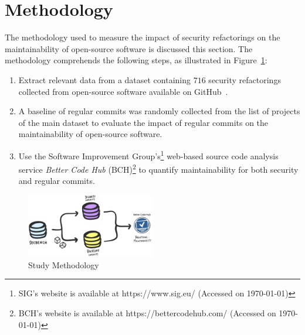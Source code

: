 \documentclass[10pt,conference]{IEEEtran}
\begin{document}
\section{Methodology}\label{sec:methodology}
%
The methodology used to measure the impact of security refactorings on the
maintainability of open-source software is discussed this section. The methodology
comprehends the following steps, as illustrated in Figure~\ref{fig:met}:
\begin{enumerate}
	\item Extract relevant data from a dataset containing
$716$ security refactorings collected from open-source software available on
GitHub~\cite{Reis:2017:IJSSE}.
	\item A baseline of regular commits was
randomly collected from the list of projects of the main dataset to evaluate the impact of regular commits on the maintainability of open-source
software.
\item Use the Software Improvement Group's\footnote{SIG's website is available
at https://www.sig.eu/ (Accessed on \today{})} web-based source code analysis
service \emph{Better Code Hub} (BCH)\footnote{BCH's website is available at
https://bettercodehub.com/ (Accessed on \today{})} to quantify
maintainability for both security and regular commits.
\end{enumerate}

%
\begin{figure}[h]
 	\centering 	\includegraphics[width=0.5\textwidth]{figures/methodology.pdf}
 	\caption{Study Methodology}
	\label{fig:met}
\end{figure}
%
\end{document}
